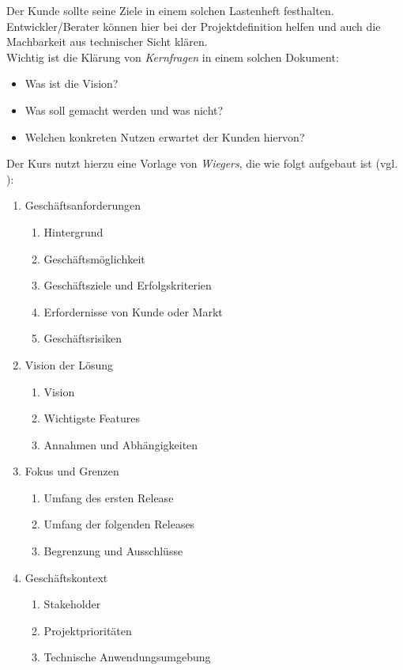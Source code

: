 \noindent
Der Kunde sollte seine Ziele in einem solchen Lastenheft festhalten. \\
Entwickler/Berater können hier bei der Projektdefinition helfen und auch die Machbarkeit aus technischer Sicht klären.\\

\noindent
Wichtig ist die Klärung von \textit{Kernfragen} in einem solchen Dokument:

\begin{itemize}
    \item Was ist die Vision?
    \item Was soll gemacht werden und was nicht?
    \item Welchen konkreten Nutzen erwartet der Kunden hiervon?
\end{itemize}

\noindent
Der Kurs nutzt hierzu eine Vorlage von \textit{Wiegers}, die wie folgt aufgebaut ist (vgl. \cite[81 ff. sowie 576 ff.]{WJ13}):

\begin{tcolorbox}[colback=white]
    \begin{enumerate}
        \item Geschäftsanforderungen
        \begin{enumerate}[label*=\arabic*.]
            \item Hintergrund
            \item Geschäftsmöglichkeit
            \item Geschäftsziele und Erfolgskriterien
            \item Erfordernisse von Kunde oder Markt
            \item Geschäftsrisiken
        \end{enumerate}
        \item Vision der Lösung
        \begin{enumerate}[label*=\arabic*.]
            \item Vision
            \item Wichtigste Features
            \item Annahmen und Abhängigkeiten
        \end{enumerate}
        \item Fokus und Grenzen
        \begin{enumerate}[label*=\arabic*.]
            \item Umfang des ersten Release
            \item Umfang der folgenden Releases
            \item Begrenzung und Ausschlüsse
        \end{enumerate}
        \item Geschäftskontext
        \begin{enumerate}[label*=\arabic*.]
            \item Stakeholder
            \item Projektprioritäten
            \item Technische Anwendungsumgebung
        \end{enumerate}
    \end{enumerate}
\end{tcolorbox}

